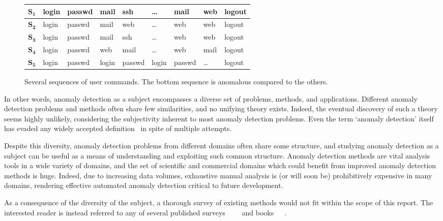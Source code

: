 \begin{figure}[htb]
    \centering
    \begin{tabular}{| l | l l l l l l l l |}
        \hline
        $\mathbf{S_1}$ & login & passwd & mail & ssh & \dots & mail & web & logout \\ \hline
        $\mathbf{S_2}$ & login & passwd & mail & web & \dots & web & web & logout \\ \hline
        $\mathbf{S_3}$ & login & passwd & mail & ssh & \dots & web & web & logout \\ \hline
        $\mathbf{S_4}$ & login & passwd & web & mail & \dots & web & mail & logout \\ \hline
        $\mathbf{S_5}$ & login & passwd & login & passwd & login & passwd & \dots & logout \\\hline
    \end{tabular}
    \caption{Several sequences of user commands. The bottom sequence is anomalous compared to the others.}
\label{fig:example1}
\end{figure}

In other words, anomaly detection as a subject encompasses a diverse set of problems, methods, and applications. Different anomaly detection problems and methods often share few similarities, and no unifying theory exists. Indeed, the eventual discovery of such a theory seems highly unlikely, considering the subjectivity inherent to most anomaly detection problems. Even the term `anomaly detection' itself has evaded any widely accepted definition~\cite{hodge} in spite of multiple attempts.

Despite this diversity, anomaly detection problems from different domains often share some structure, and studying anomaly detection as a subject can be useful as a means of understanding and exploiting such common structure. Anomaly detection methods are vital analysis tools in a wide variety of domains, and the set of scientific and commercial domains which could benefit from improved anomaly detection methods is huge. Indeed, due to increasing data volumes, exhaustive manual analysis is (or will soon be) prohibitively expensive in many domains, rendering effective automated anomaly detection critical to future development.

As a consequence of the diversity of the subject, a thorough survey of existing methods would not fit within the scope of this report. The interested reader is instead referred to any of several published surveys~\cite{hodge}~\cite{bakar}~\cite{chandola}~\cite{agyemang} and books~\cite{barnett}~\cite{hawkins}~\cite{leroy}.

